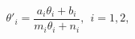 \begin{equation} \label{thetap}
\theta'_i = \frac{a_i
\theta_i + b_i}{m_i \theta_i + n_i } , \ \ i=1,2 ,
\end{equation}

